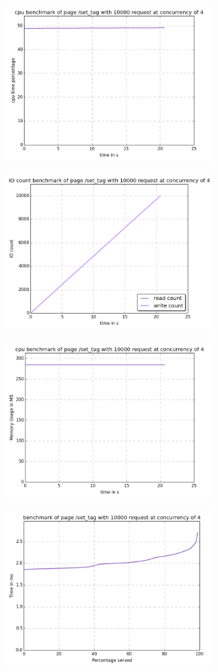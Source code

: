 \begin{center}
\includegraphics[width=0.6\textwidth]{img/set_tag.cpu.png}



\includegraphics[width=0.6\textwidth]{img/set_tag.io-count.png}



\includegraphics[width=0.6\textwidth]{img/set_tag.mem.png}



\includegraphics[width=0.6\textwidth]{img/set_tag.serv-time.png}

\end{center}
